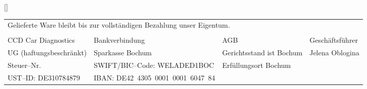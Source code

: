 []{%
\scriptsize{
\begin{tabularx}{\textwidth}{llll}
\multicolumn{4}{l}{\normalsize{Gelieferte Ware bleibt bis zur vollständigen Bezahlung unser Eigentum.}}\\
\multicolumn{4}{l}{ }\\
CCD Car Diagnostics &Bankverbindung&AGB&Geschäftsführer\\
UG (haftungsbeschränkt)&Sparkasse Bochum&Gerichtsstand ist Bochum&Jelena Oblogina\\
Steuer--Nr.&SWIFT/BIC--Code: WELADED1BOC&Erfüllungsort Bochum& \\
UST--ID: DE310784879 &IBAN: DE42\, 4305\, 0001\, 0001\, 6047\, 84& & \\
\end{tabularx}
}
}
\ifdefined\firma
\newcommand{\empfaenger}{\small{
\name \\
\strasse \\
\ort \\
\smallskip
\textbf{Lieferadresse:}\\
\textbf{\firma}\\
\firmastrasse \\
\firmaort \\
\medskip
GERMANY
}
}
\else
 \newcommand{\empfaenger}{\small{
name\\
strasse\\
ort\\
GERMANY
}
}
\fi

